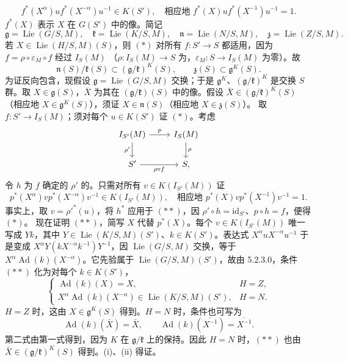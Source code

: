 \[f^*(X^\alpha)u f^*(X^{-\alpha})u^{-1}\in K(S'),\quad\text{相应地 }f^*(X)u f^*(X^{-1})u^{-1}=1.\tag{*}\]
$f^*(X)$ 表示 $X$ 在 $G(S')$ 中的像。简记
\[\mathfrak g=\operatorname{Lie}(G/S,M),\quad\mathfrak k=\operatorname{Lie}(K/S,M),\quad\mathfrak n=\operatorname{Lie}(N/S,M),\quad\mathfrak z=\operatorname{Lie}(Z/S,M).\]
若 $X\in\operatorname{Lie}(H/S,M)(S)$，则 $(*)$ 对所有 $f:S'\to S$ 都适用，因为 $f=\rho\circ\varepsilon_M\circ f$ 经过 $I_S(M)$ （$\rho:I_S(M)\to S$ 为，$\varepsilon_M:S\to I_S(M)$ 为零）。故
\[\mathfrak n(S)/\mathfrak k(S)\subset(\mathfrak g/\mathfrak k)^K(S),\qquad\mathfrak z(S)\subset\mathfrak g^K(S).\]
为证反向包含，现假设 $\mathfrak g=\operatorname{Lie}(G/S,M)$ 交换；于是 $\mathfrak g^K$、$(\mathfrak g/\mathfrak k)^K$ 是交换 $S$ 群。取 $X\in\mathfrak g(S)$，$\bar X$ 为其在 $(\mathfrak g/\mathfrak k)(S)$ 中的像。假设 $\bar X\in(\mathfrak g/\mathfrak k)^K(S)$（相应地 $X\in\mathfrak g^K(S)$），须证 $X\in\mathfrak n(S)$（相应地 $X\in\mathfrak z(S)$）。
取 $f:S'\to I_S(M)$；须对每个 $u\in K(S')$ 证 $(*)$。考虑
\[\begin{tikzcd}
I_{S'}(M)\arrow[r,"p"]\arrow[d,"\rho'"']&I_S(M)\arrow[d,"\rho"]\\S'\arrow[r,"\rho\circ f"']&S,
\end{tikzcd}\]
令 $h$ 为 $f$ 确定的 $\rho'$ 的。只需对所有 $v\in K(I_{S'}(M))$ 证
\[p^*(X^\alpha)v p^*(X^{-\alpha})v^{-1}\in K(I_{S'}(M)),\quad\text{相应地 }p^*(X)v p^*(X^{-1})v^{-1}=1.\tag{**}\]
事实上，取 $v=\rho'^*(u)$，将 $h^*$ 应用于 $(**)$，因 $\rho'\circ h=\mathrm{id}_{S'}$、$p\circ h=f$，便得 $(*)$。
现在证明 $(**)$，简写 $X$ 代替 $p^*(X)$。每个 $v\in K(I_{S'}(M))$ 唯一写成 $Yk$，其中 $Y\in\operatorname{Lie}(K/S,M)(S')$、$k\in K(S')$。表达式 $X^\alpha uX^{-\alpha}u^{-1}$ 于是变成 $X^\alpha Y(kX^{-\alpha}k^{-1})Y^{-1}$，因 $\operatorname{Lie}(G/S,M)$ 交换，等于 $X^\alpha\operatorname{Ad}(k)(X^{-\alpha})$。它先验属于 $\operatorname{Lie}(G/S,M)(S')$，故由 5.2.3.0，条件 $(**)$ 化为对每个 $k\in K(S')$，
\[\begin{cases}\operatorname{Ad}(k)(X)=X,&H=Z,\\X^\alpha\operatorname{Ad}(k)(X^{-\alpha})\in\operatorname{Lie}(K/S,M)(S'),&H=N.\end{cases}\]
$H=Z$ 时，这由 $X\in\mathfrak g^K(S)$ 得到。$H=N$ 时，条件也可写为
\[\operatorname{Ad}(k)(\bar X)=\bar X,\qquad\operatorname{Ad}(k)(\overline{X^{-1}})=\overline{X^{-1}}.\tag{*'}\]
第二式由第一式得到，因为 $K$ 在 $\mathfrak g/\mathfrak k$ 上的保持。因此 $H=N$ 时，$(**)$ 也由 $\bar X\in(\mathfrak g/\mathfrak k)^K(S)$ 得到。(i)、(ii) 得证。
